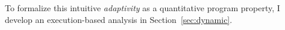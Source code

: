 \begin{enumerate}
To formalize this intuitive \emph{adaptivity} as a quantitative program property, 
I develop an execution-based analysis in Section~\ref{sec:dynamic}.


\end{enumerate}
